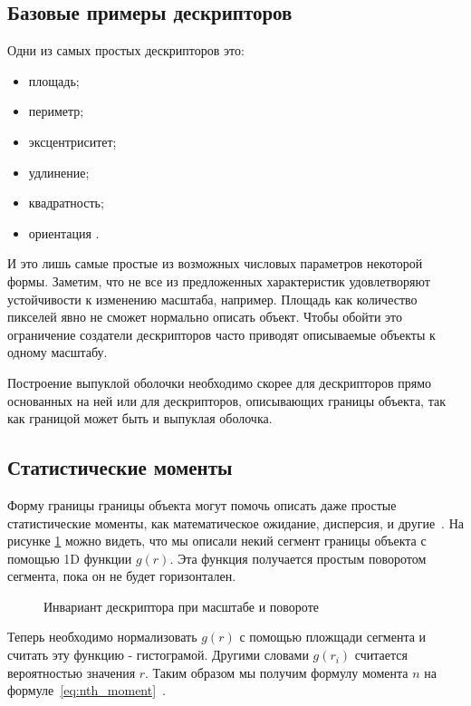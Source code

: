 \subsection{Базовые примеры дескрипторов}

Одни из самых простых дескрипторов это:
\begin{itemize}
	\item площадь;
	\item периметр;
	\item эксцентриситет;
	\item удлинение;
	\item квадратность;
	\item ориентация \cite{morse2000lecture}.
\end{itemize}

И это лишь самые простые из возможных числовых параметров некоторой формы. Заметим, что не все из предложенных характеристик удовлетворяют устойчивости к изменению масштаба, например. Площадь как количество пикселей явно не сможет нормально описать объект. Чтобы обойти это ограничение создатели дескрипторов часто приводят описываемые объекты к одному масштабу.

Построение выпуклой оболочки необходимо скорее для дескрипторов прямо основанных на ней \cite{mathew2015content} или для дескрипторов, описывающих границы объекта, так как границой может быть и выпуклая оболочка.

\subsection{Статистические моменты}

Форму границы границы объекта могут помочь описать даже простые статистические моменты, как математическое ожидание, дисперсия, и другие~\cite{gonzalez2012digital}. На рисунке \ref{img:moments} можно видеть, что мы описали некий сегмент границы объекта с помощью 1D функции $g(r)$. Эта функция получается простым поворотом сегмента, пока он не будет горизонтален.

\begin{figure}
	\centering
	
	\caption{Инвариант дескриптора при масштабе и повороте}
	\label{img:moments}
\end{figure}

Теперь необходимо нормализовать $g(r)$ с помощью пложщади сегмента и считать эту функцию - гистограмой. Другими словами $g(r_i)$ считается вероятностью значения $r$. Таким образом мы получим формулу момента $n$ на формуле~\eqref{eq:nth_moment}~\cite{gonzalez2012digital}.

